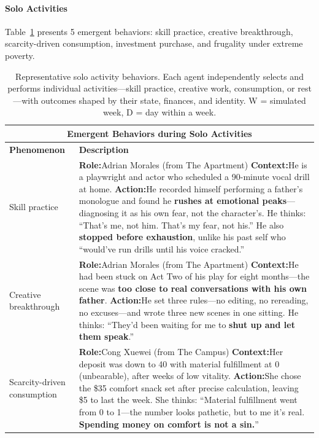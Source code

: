 \paragraph{Solo Activities}
Table~\ref{tab:solo} presents 5 emergent behaviors:
skill practice, creative breakthrough, scarcity-driven consumption, investment purchase, and frugality under extreme poverty.

\begin{table}[t]
\centering
\small
\caption{Representative solo activity behaviors. Each agent independently selects and performs individual activities---skill practice, creative work, consumption, or rest---with outcomes shaped by their state, finances, and identity. W = simulated week, D = day within a week.}
\label{tab:solo}
\begin{tabular}{p{0.8in}p{4.3in}}
\toprule
\multicolumn{2}{c}{\textbf{Emergent Behaviors during Solo Activities}} \\
\midrule
\textbf{Phenomenon} & \textbf{Description} \\
\midrule

Skill practice
&
\textbf{Role:}\quad Adrian Morales \hfill (from The Apartment) \newline
\textbf{Context:}\quad He is a playwright and actor who scheduled a 90-minute vocal drill at home. \newline
\textbf{Action:}\quad He recorded himself performing a father's monologue and found he \textbf{rushes at emotional peaks}---diagnosing it as his own fear, not the character's. He thinks: ``That's me, not him. That's my fear, not his.'' He also \textbf{stopped before exhaustion}, unlike his past self who ``would've run drills until his voice cracked.''
\\
\midrule

Creative \newline breakthrough
&
\textbf{Role:}\quad Adrian Morales \hfill (from The Apartment) \newline
\textbf{Context:}\quad He had been stuck on Act Two of his play for eight months---the scene was \textbf{too close to real conversations with his own father}. \newline
\textbf{Action:}\quad He set three rules---no editing, no rereading, no excuses---and wrote three new scenes in one sitting. He thinks: ``They'd been waiting for me to \textbf{shut up and let them speak}.''
\\
\midrule

Scarcity-\newline driven \newline consumption
&
\textbf{Role:}\quad Cong Xuewei \hfill (from The Campus) \newline
\textbf{Context:}\quad Her deposit was down to 40 with material fulfillment at 0 (unbearable), after weeks of low vitality. \newline
\textbf{Action:}\quad She chose the \$35 comfort snack set after precise calculation, leaving \$5 to last the week. She thinks: ``Material fulfillment went from 0 to 1---the number looks pathetic, but to me it's real. \textbf{Spending money on comfort is not a sin.}''
\\
\midrule


\end{tabular}
\end{table}
